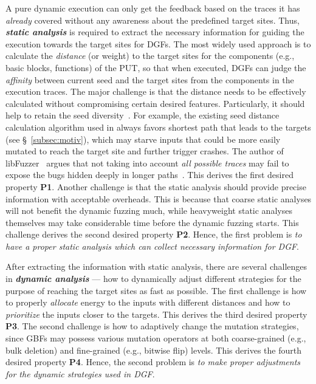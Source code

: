 A pure dynamic execution can only get the feedback based on the traces it has \emph{already} covered without any awareness about the predefined target sites.
Thus, \textbf{\emph{static analysis}} is required to extract the necessary information for guiding the execution towards the target sites for DGFs. The most widely used approach is to calculate the \emph{distance} (or weight) to the target sites for the components (e.g., basic blocks, functions) of the PUT, so that when executed, DGFs can judge the \emph{affinity} between current seed and the target sites from the components in the execution traces. 
The major challenge is that the distance needs to be effectively calculated without compromising certain desired features.
Particularly, it should help to retain the seed diversity~\cite{Audibert09}.
For example, the existing seed distance calculation algorithm used in \aflgo always favors shortest path that leads to the targets (see \S~\ref{subsec:motiv}), which may starve inputs that could be more easily mutated to reach the target site and further trigger crashes.
The author of libFuzzer~\cite{libfuzzer} argues that not taking into account \emph{all possible traces} may fail to expose the bugs hidden deeply in longer paths~\cite{kcc_aflgo}.
This derives the first desired property \textbf{P1}.
Another challenge is that the static analysis should provide precise information with acceptable overheads.
This is because that coarse static analyses will not benefit the dynamic fuzzing much, while heavyweight static analyses themselves may take considerable time before the dynamic fuzzing starts.
This challenge derives the second desired property \textbf{P2}.
Hence, the first problem is \emph{to have a proper static analysis which can collect necessary information for DGF}.

After extracting the information with static analysis, there are several  challenges in \textbf{\emph{dynamic analysis}} --- how to dynamically adjust different strategies for the purpose of reaching the target sites as fast as possible.
The first challenge is how to properly \emph{allocate} energy to the inputs with different distances and how to \emph{prioritize} the inputs closer to the targets.
This derives the third desired property \textbf{P3}.
The second challenge is how to adaptively change the mutation strategies, since GBFs may possess various mutation operators at both coarse-grained (e.g., bulk deletion) and fine-grained (e.g., bitwise flip) levels.
 This derives the fourth desired property \textbf{P4}.
Hence, the second problem is \emph{to make proper adjustments for the dynamic strategies used in DGF}.


